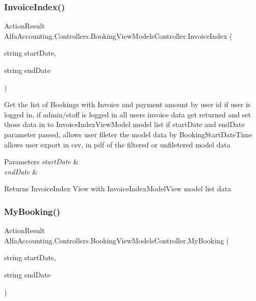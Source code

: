 \subsubsection{\texorpdfstring{Invoice\+Index()}{InvoiceIndex()}}
{\footnotesize\ttfamily Action\+Result Alfa\+Accounting.\+Controllers.\+Booking\+View\+Models\+Controller.\+Invoice\+Index (\begin{DoxyParamCaption}\item[{string}]{start\+Date,  }\item[{string}]{end\+Date }\end{DoxyParamCaption})}



Get the list of Bookings with Invoice and payment amount by user id if user is logged in, if admin/staff is logged in all user\textquotesingle{}s invoice data get returned and set those data in to Invoice\+Index\+View\+Model model list if start\+Date and end\+Date parameter passed, allows user fileter the model data by Booking\+Start\+Date\+Time allows user export in csv, in pdf of the filtered or unfiletered model data 


\begin{DoxyParams}{Parameters}
{\em start\+Date} & \\
\hline
{\em end\+Date} & \\
\hline
\end{DoxyParams}
\begin{DoxyReturn}{Returns}
Invoice\+Index View with Invoice\+Index\+Model\+View model list data
\end{DoxyReturn}
\mbox{\label{class_alfa_accounting_1_1_controllers_1_1_booking_view_models_controller_a361d39aedee7dbfdacfaae1c1a9c67cc}} 
\subsubsection{\texorpdfstring{My\+Booking()}{MyBooking()}}
{\footnotesize\ttfamily Action\+Result Alfa\+Accounting.\+Controllers.\+Booking\+View\+Models\+Controller.\+My\+Booking (\begin{DoxyParamCaption}\item[{string}]{start\+Date,  }\item[{string}]{end\+Date }\end{DoxyParamCaption})}



